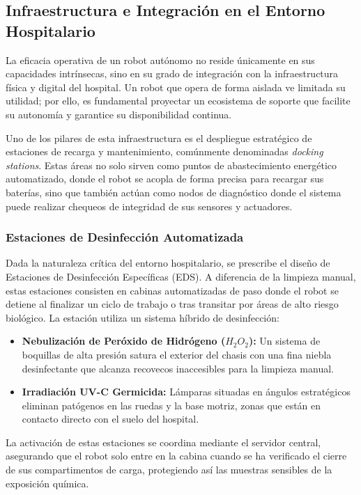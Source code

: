 \subsection{Infraestructura e Integración en el Entorno Hospitalario}
La eficacia operativa de un robot autónomo no reside únicamente en sus capacidades intrínsecas, sino en su grado de integración con la infraestructura física y digital del hospital. Un robot que opera de forma aislada ve limitada su utilidad; por ello, es fundamental proyectar un ecosistema de soporte que facilite su autonomía y garantice su disponibilidad continua.

Uno de los pilares de esta infraestructura es el despliegue estratégico de estaciones de recarga y mantenimiento, comúnmente denominadas \textit{docking stations}. Estas áreas no solo sirven como puntos de abastecimiento energético automatizado, donde el robot se acopla de forma precisa para recargar sus baterías, sino que también actúan como nodos de diagnóstico donde el sistema puede realizar chequeos de integridad de sus sensores y actuadores.

\subsubsection{Estaciones de Desinfección Automatizada}
Dada la naturaleza crítica del entorno hospitalario, se prescribe el diseño de Estaciones de Desinfección Específicas (EDS). A diferencia de la limpieza manual, estas estaciones consisten en cabinas automatizadas de paso donde el robot se detiene al finalizar un ciclo de trabajo o tras transitar por áreas de alto riesgo biológico. La estación utiliza un sistema híbrido de desinfección:
\begin{itemize}
    \item \textbf{Nebulización de Peróxido de Hidrógeno ($H_2O_2$):} Un sistema de boquillas de alta presión satura el exterior del chasis con una fina niebla desinfectante que alcanza recovecos inaccesibles para la limpieza manual.
    \item \textbf{Irradiación UV-C Germicida:} Lámparas situadas en ángulos estratégicos eliminan patógenos en las ruedas y la base motriz, zonas que están en contacto directo con el suelo del hospital.
\end{itemize}
La activación de estas estaciones se coordina mediante el servidor central, asegurando que el robot solo entre en la cabina cuando se ha verificado el cierre de sus compartimentos de carga, protegiendo así las muestras sensibles de la exposición química.


